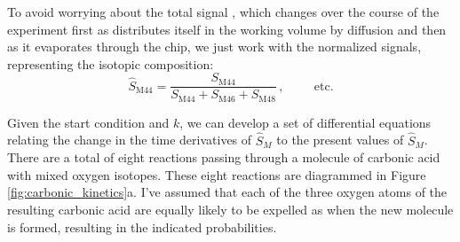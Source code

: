 To avoid worrying about the total signal , which changes over the course of the experiment first as  distributes itself in the working volume by diffusion and then as it evaporates through the chip, we just work with the normalized signals, representing the isotopic composition:
\begin{equation}
\hat{S}_\text{M44} = \frac{S_\text{M44}}{S_\text{M44} + S_\text{M46} + S_\text{M48}}\,,\hspace{1cm}\text{etc.}
\end{equation}

Given the start condition and $k$, we can develop a set of differential equations relating the change in the time derivatives of $\hat{S}_M$ to the present values of $\hat{S}_M$. There are a total of eight reactions passing through a molecule of carbonic acid with mixed oxygen isotopes. These eight reactions are diagrammed in Figure \ref{fig:carbonic_kinetics}a. I've assumed that each of the three oxygen atoms of the resulting carbonic acid are equally likely to be expelled as  when the new  molecule is formed, resulting in the indicated probabilities.

